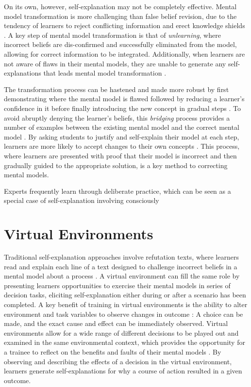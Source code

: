 On its own, however, self-explanation may not be completely effective. Mental model transformation is more challenging than false belief revision, due to the tendency of learners to reject conflicting information and erect knowledge shields \citep{Klein2006}. A key step of mental model transformation is that of \emph{unlearning}, where incorrect beliefs are dis-confirmed and successfully eliminated from the model, allowing for correct information to be integrated. Additionally, when learners are not aware of flaws in their mental models, they are unable to generate any self-explanations \citep{Chi2002} that leads mental model transformation \citep{Chi2008}.

The transformation process can be hastened and made more robust by first demonstrating where the mental model is flawed followed by reducing a learner's confidence in it before finally introducing the new concept in gradual steps \citep{Klein2006}. To avoid abruptly denying the learner's beliefs, this \emph{bridging} process provides a number of examples between the existing mental model and the correct mental model \citep{Brown1989}. By asking students to justify and self-explain their model at each step, learners are more likely to accept changes to their own concepts \citep{Brown1989, Chi2008, Chi1994, Klein2006}. This process, where learners are presented with proof that their model is incorrect and then gradually guided to the appropriate solution, is a key method to correcting mental models.

Experts frequently learn through deliberate practice, which can be seen as a special case of self-explanation involving consciously

\section{Virtual Environments}

Traditional self-explanation approaches involve refutation texts, where learners read and explain each line of a text designed to challenge incorrect beliefs in a mental model about a process \citep{Chi1994}. A virtual environment can fill the same role by presenting learners opportunities to exercise their mental models in series of decision tasks, eliciting self-explanation either during or after a scenario has been completed. A key benefit of training in virtual environments is the ability to alter environment and task variables to observe changes in outcome \citep{Klein2006}: A choice can be made, and the exact cause and effect can be immediately observed. Virtual environments allow for a wide range of different decisions to be played out and examined in the same environmental context, which provides the opportunity for a trainee to reflect on the benefits and faults of their mental models \citep{Salzman1999}. By observing and describing the effects of a decision in the virtual environment, learners generate self-explanations for why a course of action resulted in a given outcome.


